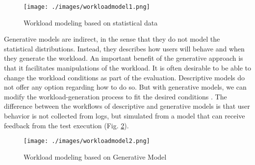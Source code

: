 \begin{figure}[!ht]
\centering
\texttt{[image: ./images/workloadmodel1.png]}
\caption{Workload modeling based on statistical data \cite{DiLucca2006}}
\label{fig:descriptivemodel}
\end{figure}

Generative models are indirect, in the sense that they do not model the statistical distributions. Instead, they describes how users will behave and when they generate the workload. An important benefit of the generative approach is
that it facilitates manipulations of the workload. It is often desirable to be able to change the workload conditions as part of the evaluation. Descriptive models do not offer any option regarding how to do so. But with generative models, we can modify the workload-generation process to fit the desired conditions \cite{DiLucca2006}. The difference between the workflows of descriptive and generative models is that user behavior is not collected from logs, but simulated from a model that can receive feedback from the test execution (Fig. \ref{fig:generativemodel}).

\begin{figure}[!ht]
\centering
\texttt{[image: ./images/workloadmodel2.png]}
\caption{Workload modeling based on Generative Model \cite{DiLucca2006}}
\label{fig:generativemodel}
\end{figure}
%
%